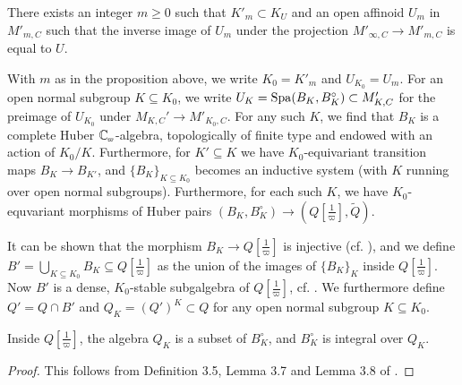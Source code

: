 \documentclass[../main.tex]{subfiles}
\begin{document}
\begin{prop}\label{prop:FiniteLevelU}
  There exists an integer $m \geq 0$ such that $K'_m \subset K_U$ and an open affinoid
  $U_m$ in $M'_{m, C}$ such that the inverse image of $U_m$ under the projection
  $M'_{\infty, C} \to M'_{m, C}$ is equal to $U$. 
\end{prop}
With $m$ as in the proposition above, we write $K_0 = K'_m$ and $U_{K_0} = 
U_m$. For an open normal subgroup $K \subseteq K_0$, we write $U_K = \operatorname{Spa}(B_K,
B^\circ_K) \subset M'_{K, C}$ for the preimage of $U_{K_0}$ under 
$M_{K,C}' \to M'_{K_0, C}$. For any such $K$, we find
that $B_K$ is a complete Huber $\Cp$-algebra, 
topologically of finite type and endowed with an action of $K_0/K$. Furthermore,
for $K' \subseteq K$ we have $K_0$-equivariant transition maps $B_{K} \to B_{K'}$,
and $\{B_K\}_{K \subseteq K_0}$ becomes an inductive system (with $K$ running over 
open normal subgroups). Furthermore, for each such $K$, we have $K_0$-equvariant morphisms
of Huber pairs $(B_K, B_K^\circ) \to (Q[\tfrac 1\varpi], \tilde Q)$.

It can be shown that the morphism $B_K \to Q[\tfrac 1\varpi]$ is injective
(cf. \cite[Lemma 3.4]{mieda2016geometric}), and we define $B' =
\bigcup_{K\subseteq K_0} B_K \subseteq Q[\tfrac 1\varpi]$ as the union
of the images of $\{B_K\}_K$ inside $Q[\tfrac 1\varpi]$. Now $B'$ 
is a dense, $K_0$-stable subgalgebra of $Q[\tfrac 1\varpi]$, cf.
\cite[Proposition 4.5]{mieda2016geometric}. We furthermore define
$Q' = Q \cap B'$ and $Q_K = (Q')^K \subset Q$ for any open normal subgroup $K
\subseteq K_0$. 

\begin{lem}\label{lem:BKisIntegralOverQK}
  Inside $Q[\tfrac 1\varpi]$, the algebra $Q_K$ is a subset of $B_K^\circ$,
  and $B_K^\circ$ is integral over $Q_K$. 
\begin{proof}
  This follows from Definition 3.5, Lemma 3.7 and Lemma 3.8 of \cite{mieda2016geometric}. 
\end{proof}
\end{lem}
\end{document}
